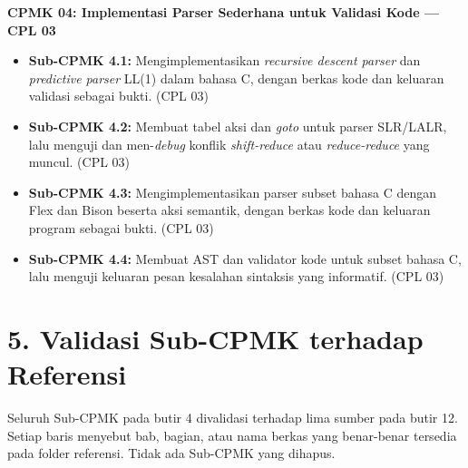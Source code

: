 \documentclass[12pt,a4paper]{article}
\begin{document}
\noindent\textbf{CPMK 04: Implementasi Parser Sederhana untuk Validasi Kode --- CPL 03}
\begin{itemize}[leftmargin=*]
  \item \textbf{Sub-CPMK 4.1:} Mengimplementasikan \textit{recursive descent parser} dan \textit{predictive parser} LL(1) dalam bahasa C, dengan berkas kode dan keluaran validasi sebagai bukti. (CPL 03)
  \item \textbf{Sub-CPMK 4.2:} Membuat tabel aksi dan \textit{goto} untuk parser SLR/LALR, lalu menguji dan men-\textit{debug} konflik \textit{shift-reduce} atau \textit{reduce-reduce} yang muncul. (CPL 03)
  \item \textbf{Sub-CPMK 4.3:} Mengimplementasikan parser subset bahasa C dengan Flex dan Bison beserta aksi semantik, dengan berkas kode dan keluaran program sebagai bukti. (CPL 03)
  \item \textbf{Sub-CPMK 4.4:} Membuat AST dan validator kode untuk subset bahasa C, lalu menguji keluaran pesan kesalahan sintaksis yang informatif. (CPL 03)
\end{itemize}

\vspace{0.5cm}

\section*{5. Validasi Sub-CPMK terhadap Referensi}

Seluruh Sub-CPMK pada butir 4 divalidasi terhadap lima sumber pada butir 12. Setiap baris menyebut bab, bagian, atau nama berkas yang benar-benar tersedia pada folder referensi. Tidak ada Sub-CPMK yang dihapus.
\end{document}
